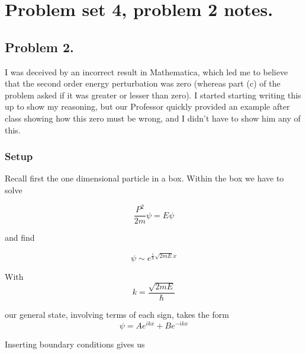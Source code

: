 %
%

\chapter{Problem set 4, problem 2 notes.}
\label{chap:qmTwoPs4}
{}
\date{Oct 12, 2011}

\beginArtNoToc

\section{Problem 2.}

I was deceived by an incorrect result in Mathematica, which led me to believe that the second order energy perturbation was zero (whereas part (c) of the problem asked if it was greater or lesser than zero).  I started starting writing this up to show my reasoning, but our Professor quickly provided an example after class showing how this zero must be wrong, and I didn't have to show him any of this.

\subsection{Setup}

Recall first the one dimensional particle in a box.  Within the box we have to solve

\begin{equation}\label{eqn:qmTwoPs4:10}
\frac{P^2}{2m} \psi = E\psi
\end{equation}

and find 

\begin{equation}\label{eqn:qmTwoPs4:30}
\psi \sim
e^{\frac{i}{\hbar} \sqrt{2 m E} x} 
\end{equation}

With
\begin{equation}\label{eqn:qmTwoPs4:50}
k = \frac{\sqrt{2 m E}}{\hbar}
\end{equation}

our general state, involving terms of each sign, takes the form
\begin{equation}\label{eqn:qmTwoPs4:70}
\psi = 
A e^{ i k x } +B e^{ -i k x }
\end{equation}

Inserting boundary conditions gives us


